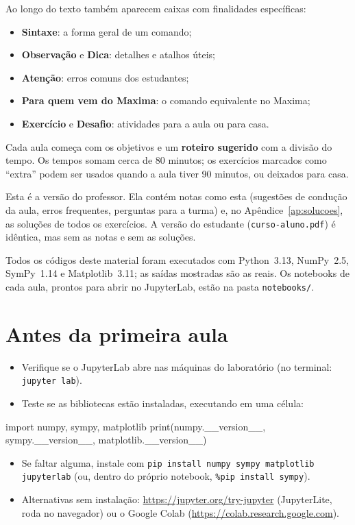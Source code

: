 \noindent Ao longo do texto também aparecem caixas com finalidades específicas:

\begin{itemize}
  \item \textcolor{azul}{\textbf{Sintaxe}}: a forma geral de um comando;
  \item \textcolor{verde!70!black}{\textbf{Observação}} e \textcolor{laranja}{\textbf{Dica}}: detalhes e atalhos úteis;
  \item \textcolor{vermelho}{\textbf{Atenção}}: erros comuns dos estudantes;
  \item \textcolor{roxo}{\textbf{Para quem vem do Maxima}}: o comando equivalente no Maxima;
  \item \textbf{Exercício} e \textbf{Desafio}: atividades para a aula ou para casa.
\end{itemize}

Cada aula começa com os objetivos e um \textbf{roteiro sugerido} com a divisão do tempo. Os tempos somam cerca de
80 minutos; os exercícios marcados como ``extra'' podem ser usados quando a aula tiver 90 minutos, ou deixados para casa.

\ifprofessor
\begin{professor}
Esta é a versão do professor. Ela contém notas como esta (sugestões de condução da aula, erros frequentes,
perguntas para a turma) e, no Apêndice~\ref{ap:solucoes}, as soluções de todos os exercícios. A versão do
estudante (\texttt{curso-aluno.pdf}) é idêntica, mas sem as notas e sem as soluções.

Todos os códigos deste material foram executados com Python~3.13, NumPy~2.5, SymPy~1.14 e Matplotlib~3.11; as
saídas mostradas são as reais. Os notebooks de cada aula, prontos para abrir no JupyterLab, estão na pasta
\texttt{notebooks/}.
\end{professor}
\fi

\section*{Antes da primeira aula}

\begin{itemize}
  \item Verifique se o JupyterLab abre nas máquinas do laboratório (no terminal: \texttt{jupyter lab}).
  \item Teste se as bibliotecas estão instaladas, executando em uma célula:
\end{itemize}
\begin{codigo}
import numpy, sympy, matplotlib
print(numpy.__version__, sympy.__version__, matplotlib.__version__)
\end{codigo}
\begin{itemize}
  \item Se faltar alguma, instale com \texttt{pip install numpy sympy matplotlib jupyterlab} (ou, dentro do próprio
  notebook, \texttt{\%pip install sympy}).
  \item Alternativas sem instalação: \url{https://jupyter.org/try-jupyter} (JupyterLite, roda no navegador) ou o
  Google Colab (\url{https://colab.research.google.com}).
\end{itemize}
